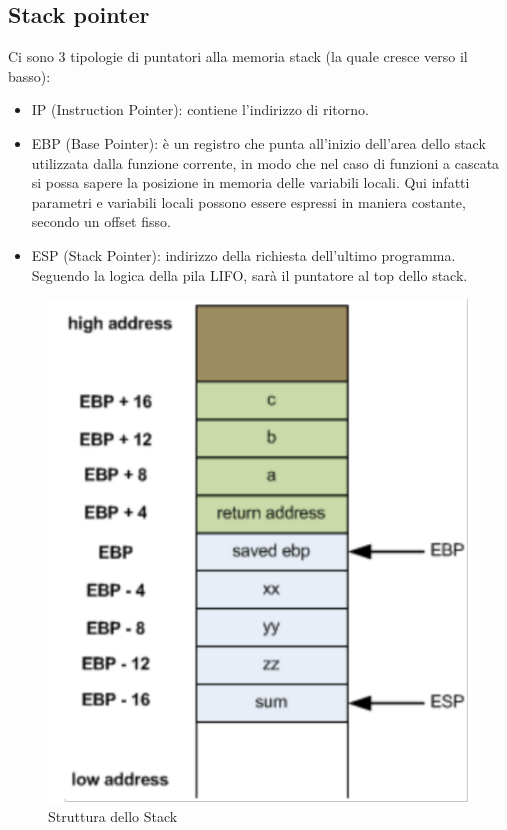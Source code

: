 \documentclass[8pt]{extarticle}
\begin{document}
\subsection{Stack pointer}
Ci sono 3 tipologie di puntatori alla memoria stack (la quale cresce verso il basso):
\begin{itemize}
    \item IP (Instruction Pointer): contiene l’indirizzo di ritorno.
    \item EBP (Base Pointer): è un registro che punta all’inizio dell’area dello stack utilizzata dalla 
    funzione corrente, in modo che nel caso di funzioni a cascata si possa sapere la posizione in memoria 
    delle variabili locali. Qui infatti parametri e variabili locali possono essere espressi in maniera 
    costante, secondo un offset fisso.
    \item ESP (Stack Pointer): indirizzo della richiesta dell’ultimo programma. Seguendo la logica della 
    pila LIFO, sarà il puntatore al top dello stack. 
\end{itemize}
\begin{figure}[H]
    \center
    \includegraphics[scale=0.15]{images/BO4.png}
    \caption{Struttura dello Stack}\label{fig:1}
\end{figure}
\end{document}
